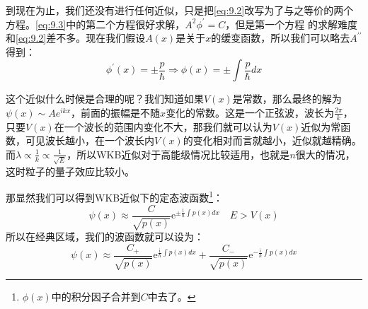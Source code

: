 \documentclass[a4paper,zihao=-4,linespread=1]{ctexrep}
\begin{document}
    到现在为止，我们还没有进行任何近似，只是把\ref{eq:9.2}改写为了与之等价的两个方程。\ref{eq:9.3}中的第二个方程很好求解，$A^2\phi^\prime=C$，但是第一个方程
    的求解难度和\ref{eq:9.2}差不多。现在我们假设$A(x)$是关于$x$的缓变函数，所以我们可以略去$A^{\prime\prime}$得到：
    \[\phi^\prime(x)=\pm\frac{p}{\hbar}\Rightarrow\phi(x)=\pm\int\frac{p}{\hbar}dx\]

    这个近似什么时候是合理的呢？我们知道如果$V(x)$是常数，那么最终的解为$\psi(x)\sim Ae^{ikx}$，前面的振幅是不随$x$变化的常数。这是一个正弦波，波长为$\frac{2\pi}{k}$，
    只要$V(x)$在一个波长的范围内变化不大，那我们就可以认为$V(x)$近似为常函数，可见波长越小，在一个波长内$V(x)$的变化相对而言就越小，近似就越精确。而$\lambda\propto\frac{1}{k}\propto\frac{1}{\sqrt{E}}$，所以WKB近似对于高能级情况比较适用，也就是$n$很大的情况，
    这时粒子的量子效应比较小。

    那显然我们可以得到WKB近似下的定态波函数\footnote{$\phi(x)$中的积分因子合并到$C$中去了。}：
    \begin{equation}
        \boxed{\psi(x)\approx\frac{C}{\sqrt{p(x)}}\mathrm{e}^{\pm\frac{\mathrm{i}}{\hbar}\int p(x)dx}\quad E>V(x)}
    \end{equation}
    所以在经典区域，我们的波函数就可以设为：
    \begin{equation}
        \label{eq:9.5}
        \psi(x)\approx\frac{C_+}{\sqrt{p(x)}}\mathrm{e}^{\frac{\mathrm{i}}{\hbar}\int p(x)dx}+\frac{C_-}{\sqrt{p(x)}}\mathrm{e}^{-\frac{\mathrm{i}}{\hbar}\int p(x)dx}
    \end{equation}
    
\end{document}
